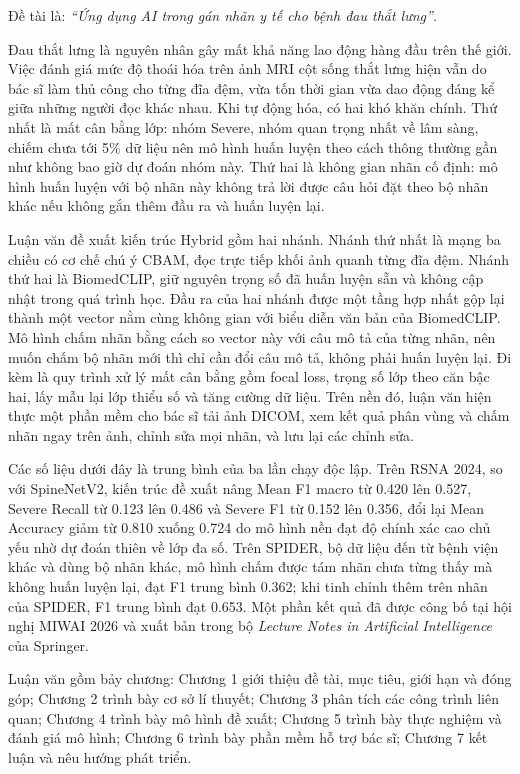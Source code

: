 \documentclass[12pt]{report}
\begin{document}
Đề tài là: \textit{``Ứng dụng AI trong gán nhãn y tế cho bệnh đau thắt lưng''}.

Đau thắt lưng là nguyên nhân gây mất khả năng lao động hàng đầu trên thế giới. Việc đánh giá mức độ thoái hóa trên ảnh MRI cột sống thắt lưng hiện vẫn do bác sĩ làm thủ công cho từng đĩa đệm, vừa tốn thời gian vừa dao động đáng kể giữa những người đọc khác nhau. Khi tự động hóa, có hai khó khăn chính. Thứ nhất là mất cân bằng lớp: nhóm Severe, nhóm quan trọng nhất về lâm sàng, chiếm chưa tới 5\% dữ liệu nên mô hình huấn luyện theo cách thông thường gần như không bao giờ dự đoán nhóm này. Thứ hai là không gian nhãn cố định: mô hình huấn luyện với bộ nhãn này không trả lời được câu hỏi đặt theo bộ nhãn khác nếu không gắn thêm đầu ra và huấn luyện lại.

Luận văn đề xuất kiến trúc Hybrid gồm hai nhánh. Nhánh thứ nhất là mạng ba chiều có cơ chế chú ý CBAM, đọc trực tiếp khối ảnh quanh từng đĩa đệm. Nhánh thứ hai là BiomedCLIP, giữ nguyên trọng số đã huấn luyện sẵn và không cập nhật trong quá trình học. Đầu ra của hai nhánh được một tầng hợp nhất gộp lại thành một vector nằm cùng không gian với biểu diễn văn bản của BiomedCLIP. Mô hình chấm nhãn bằng cách so vector này với câu mô tả của từng nhãn, nên muốn chấm bộ nhãn mới thì chỉ cần đổi câu mô tả, không phải huấn luyện lại. Đi kèm là quy trình xử lý mất cân bằng gồm focal loss, trọng số lớp theo căn bậc hai, lấy mẫu lại lớp thiểu số và tăng cường dữ liệu. Trên nền đó, luận văn hiện thực một phần mềm cho bác sĩ tải ảnh DICOM, xem kết quả phân vùng và chấm nhãn ngay trên ảnh, chỉnh sửa mọi nhãn, và lưu lại các chỉnh sửa.

Các số liệu dưới đây là trung bình của ba lần chạy độc lập. Trên RSNA 2024, so với SpineNetV2, kiến trúc đề xuất nâng Mean F1 macro từ 0.420 lên 0.527, Severe Recall từ 0.123 lên 0.486 và Severe F1 từ 0.152 lên 0.356, đổi lại Mean Accuracy giảm từ 0.810 xuống 0.724 do mô hình nền đạt độ chính xác cao chủ yếu nhờ dự đoán thiên về lớp đa số. Trên SPIDER, bộ dữ liệu đến từ bệnh viện khác và dùng bộ nhãn khác, mô hình chấm được tám nhãn chưa từng thấy mà không huấn luyện lại, đạt F1 trung bình 0.362; khi tinh chỉnh thêm trên nhãn của SPIDER, F1 trung bình đạt 0.653. Một phần kết quả đã được công bố tại hội nghị MIWAI 2026 và xuất bản trong bộ \textit{Lecture Notes in Artificial Intelligence} của Springer.

Luận văn gồm bảy chương: Chương 1 giới thiệu đề tài, mục tiêu, giới hạn và đóng góp; Chương 2 trình bày cơ sở lí thuyết; Chương 3 phân tích các công trình liên quan; Chương 4 trình bày mô hình đề xuất; Chương 5 trình bày thực nghiệm và đánh giá mô hình; Chương 6 trình bày phần mềm hỗ trợ bác sĩ; Chương 7 kết luận và nêu hướng phát triển.
\end{document}
